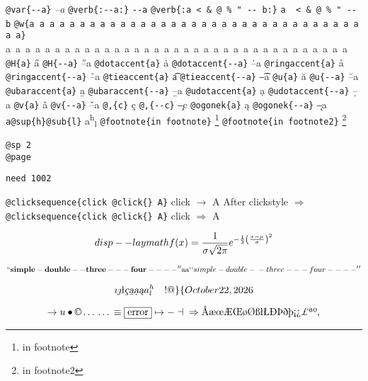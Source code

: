 \documentclass{book}
\begin{document}
\texttt{@var\{{-}{-}a\}} \textsl{--a}
\texttt{@verb\{:{-}{-}a:\}} \verb:--a:
\texttt{@verb\{:a  < \& @ \% " {-}{-}    b:\}} \verb:a  < & @ % " --    b:
\texttt{@w\{a a a a a a a a a a a a a a a a a a a a a a a a a a a a a a a a a a a\}} \hbox{a a a a a a a a a a a a a a a a a a a a a a a a a a a a a a a a a a a}
\texttt{@H\{a\}} \H{a}
\texttt{@H\{{-}{-}a\}} \H{--a}
\texttt{@dotaccent\{a\}} \.{a}
\texttt{@dotaccent\{{-}{-}a\}} \.{--a}
\texttt{@ringaccent\{a\}} \r{a}
\texttt{@ringaccent\{{-}{-}a\}} \r{--a}
\texttt{@tieaccent\{a\}} \t{a}
\texttt{@tieaccent\{{-}{-}a\}} \t{--a}
\texttt{@u\{a\}} \u{a}
\texttt{@u\{{-}{-}a\}} \u{--a}
\texttt{@ubaraccent\{a\}} \b{a}
\texttt{@ubaraccent\{{-}{-}a\}} \b{--a}
\texttt{@udotaccent\{a\}} \d{a}
\texttt{@udotaccent\{{-}{-}a\}} \d{--a}
\texttt{@v\{a\}} \v{a}
\texttt{@v\{{-}{-}a\}} \v{--a}
\texttt{@,\{c\}} \c{c}
\texttt{@,\{{-}{-}c\}} \c{--c}
\texttt{@ogonek\{a\}} \k{a}
\texttt{@ogonek\{{-}{-}a\}} \k{--a}
\texttt{a@sup\{h\}@sub\{l\}} a\textsuperscript{h}\textsubscript{l}
\texttt{@footnote\{in footnote\}} \footnote{in footnote}
\texttt{@footnote\{in footnote2\}} \footnote{in footnote2}

\texttt{@sp 2}\leavevmode{}\\
\baselineskip %
\texttt{@page}\leavevmode{}\\
\newpage{}%
\phantom{blabla}%

\texttt{need 1002}
\needspace{1.002pt}%

\texttt{@clicksequence\{click @click\{\} A\}} click $\rightarrow{}$ A
After clickstyle $\Rightarrow{}$
\texttt{@clicksequence\{click @click\{\} A\}} click $\Rightarrow{}$ A


$$
disp--laymath
f(x) = {1 \over \sigma \sqrt{2\pi}}e^{-{1 \over 2}\left({x-\mu \over \sigma}\right)^2}
$$

$$
\mathbf{``simple-double--three---four----''} \hbox{aa}
`\hbox{}`simple-double-\hbox{}-three---four----'\hbox{}'
$$

$$
\imath{} \jmath{}
\mathord{\text{\l{}}} \textsl{\c{c}}
\textsl{\b{a}} \textsl{\d{a}} \textsl{\k{a}} a^{h}_{l}
 \ {}\ {} \ {}\-{}  ! @ \} \{ 
\today{}
$$

$$
\rightarrow{}
u
\bullet{} \copyright{} \dots{} \dots{} \equiv{}
\fbox{error} \mapsto{} - \dashv{} \Rightarrow{}
\mathord{\text{\AA{}}} \mathord{\text{\ae{}}} \mathord{\text{\oe{}}} \mathord{\text{\AE{}}} \mathord{\text{\OE{}}} \mathord{\text{\o{}}} \mathord{\text{\O{}}} \mathord{\text{\ss{}}} \mathord{\text{\l{}}} \mathord{\text{\L{}}} \mathord{\text{\DH{}}}
\mathord{\text{\TH{}}} \mathord{\text{\dh{}}} \mathord{\text{\th{}}} \mathord{\text{\textexclamdown{}}} \mathord{\text{\textquestiondown{}}} \mathsterling{}
\mathord{\text{\textordfeminine{}}} \mathord{\text{\textordmasculine{}}} , 
$$
\end{document}
